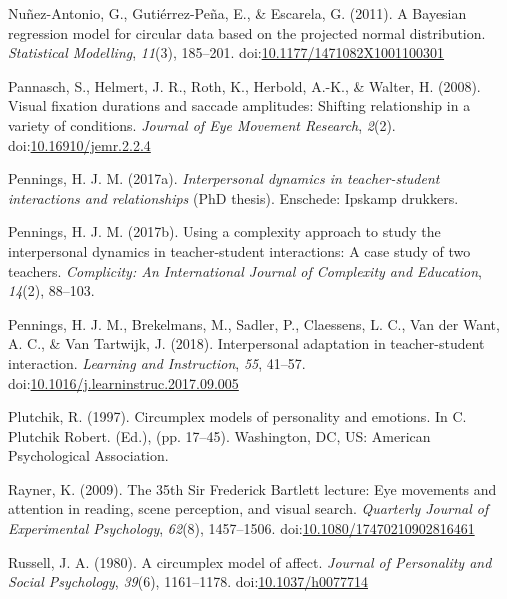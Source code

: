 \documentclass[man,mask]{apa6}
\DeclareRobustCommand{\VANDER}[3]{#2}
\DeclareRobustCommand{\VAN}[3]{#2}
\begin{document}
\leavevmode\hypertarget{ref-nunez2011bayesian}{}%
Nuñez-Antonio, G., Gutiérrez-Peña, E., \& Escarela, G. (2011). A Bayesian regression model for circular data based on the projected normal distribution. \emph{Statistical Modelling}, \emph{11}(3), 185--201. doi:\href{https://doi.org/10.1177/1471082X1001100301}{10.1177/1471082X1001100301}

\leavevmode\hypertarget{ref-pannasch2008duration}{}%
Pannasch, S., Helmert, J. R., Roth, K., Herbold, A.-K., \& Walter, H. (2008). Visual fixation durations and saccade amplitudes: Shifting relationship in a variety of conditions. \emph{Journal of Eye Movement Research}, \emph{2}(2). doi:\href{https://doi.org/10.16910/jemr.2.2.4}{10.16910/jemr.2.2.4}

\leavevmode\hypertarget{ref-pennings2017phd}{}%
Pennings, H. J. M. (2017a). \emph{Interpersonal dynamics in teacher-student interactions and relationships} (PhD thesis). Enschede: Ipskamp drukkers.

\leavevmode\hypertarget{ref-pennings2017complexity}{}%
Pennings, H. J. M. (2017b). Using a complexity approach to study the interpersonal dynamics in teacher-student interactions: A case study of two teachers. \emph{Complicity: An International Journal of Complexity and Education}, \emph{14}(2), 88--103.

\leavevmode\hypertarget{ref-pennings2018interpersonal}{}%
Pennings, H. J. M., Brekelmans, M., Sadler, P., Claessens, L. C., \VANDER{Want}{Van der}{van der} Want, A. C., \& \VAN{Tartwijk}{Van}{van} Tartwijk, J. (2018). Interpersonal adaptation in teacher-student interaction. \emph{Learning and Instruction}, \emph{55}, 41--57. doi:\href{https://doi.org/10.1016/j.learninstruc.2017.09.005}{10.1016/j.learninstruc.2017.09.005}

\leavevmode\hypertarget{ref-plutchik1997general}{}%
Plutchik, R. (1997). Circumplex models of personality and emotions. In C. Plutchik Robert. (Ed.), (pp. 17--45). Washington, DC, US: American Psychological Association.

\leavevmode\hypertarget{ref-rayner200935th}{}%
Rayner, K. (2009). The 35th Sir Frederick Bartlett lecture: Eye movements and attention in reading, scene perception, and visual search. \emph{Quarterly Journal of Experimental Psychology}, \emph{62}(8), 1457--1506. doi:\href{https://doi.org/10.1080/17470210902816461}{10.1080/17470210902816461}

\leavevmode\hypertarget{ref-russell1980circumplex}{}%
Russell, J. A. (1980). A circumplex model of affect. \emph{Journal of Personality and Social Psychology}, \emph{39}(6), 1161--1178. doi:\href{https://doi.org/10.1037/h0077714}{10.1037/h0077714}
\end{document}
